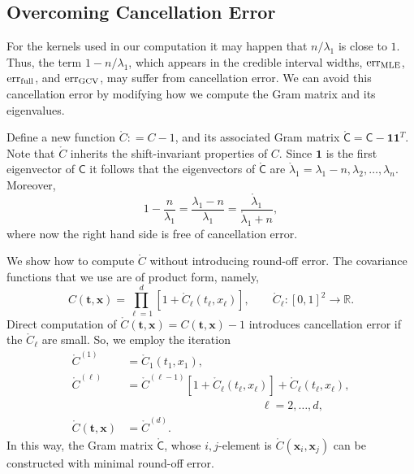 \documentclass[twocolumn]{svjour3}          %
\newcommand{\bm}[1]{\boldsymbol{#1}}
\newcommand{\reals}{\mathbb{R}}
\newcommand{\rC}{\mathring{C}}
\newcommand{\rlambda}{\mathring{\lambda}}
\newcommand{\vt}{\bm{t}}
\newcommand{\vx}{\bm{x}}
\newcommand{\vone}{\bm{1}}
\newcommand{\mC}{\mathsf{C}}
\newcommand{\rmC}{\mathring{\mathsf{C}}}
\newcommand{\MLE}{\text{MLE}}
\newcommand{\err}{\textup{err}}
\begin{document}
\subsection{Overcoming Cancellation Error}
For the kernels used in our computation it may happen that $n/\lambda_1$ is close to $1$.  Thus, the term $1-n/\lambda_1$, which appears in the credible interval widths, $\err_{\MLE}$, $\err_{\textup{full}}$, and $\err_{\textup{GCV}}$, may suffer from cancellation error.  We can avoid this cancellation error by modifying how we compute the Gram matrix and its eigenvalues.

Define a new function $\rC : = C -1$, and its associated Gram matrix $\rmC = \mC - \vone \vone^T$.   Note that $\rC$ inherits the shift-invariant properties of $C$.  Since $\vone$ is the first eigenvector of $\mC$ it follows that the eigenvectors of $\rmC$ are $\rlambda_1 = \lambda_1 - n, \lambda_2, \ldots, \lambda_n$.  Moreover,
\begin{equation}
1 - \frac{n}{\lambda_1}  = \frac{\lambda_1 - n}{\lambda_1} = \frac{\rlambda_1}{\rlambda_1 +n},
\end{equation}
where now the right hand side is free of cancellation error.

We show how to compute $\rC$ without introducing round-off error.  The covariance functions that we use are of product form, namely,
\begin{equation*}
C(\vt, \vx) = \prod_{\ell=1}^d \left[1 + \rC_\ell(t_\ell,x_\ell) \right], \qquad  \rC_\ell:[0,1]^2 \to \reals.
\end{equation*}
Direct computation of $\rC (\vt,\vx) = C(\vt,\vx) -1$ introduces cancellation error if the $ \rC_\ell$ are small.  So, we employ the iteration
\begin{align*}
\rC^{(1)} &= \rC_1(t_1,x_1),  \\
\rC^{(\ell)} &  = \rC^{(\ell-1)}[1 + \rC_\ell(t_\ell,x_\ell)] + \rC_\ell(t_\ell,x_\ell), \\
& \hspace{5cm} \ell = 2, \ldots, d, \\
\rC(\vt,\vx)  & = \rC^{(d)}.
\end{align*}
In this way, the Gram matrix $\rmC$, whose $i,j$-element is $\rC(\vx_i,\vx_j)$ can be constructed with minimal round-off error.
\end{document}
